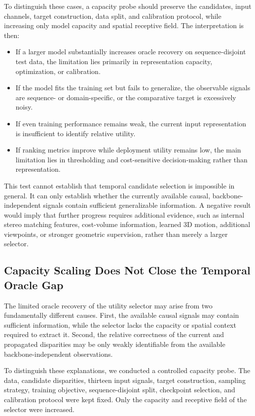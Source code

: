 \documentclass[11pt,a4paper]{article}
\begin{document}
To distinguish these cases, a capacity probe should preserve the candidates, input channels, target construction, data split, and calibration protocol, while increasing only model capacity and spatial receptive field. The interpretation is then:

\begin{itemize}
    \item If a larger model substantially increases oracle recovery on sequence-disjoint test data, the limitation lies primarily in representation capacity, optimization, or calibration.
    \item If the model fits the training set but fails to generalize, the observable signals are sequence- or domain-specific, or the comparative target is excessively noisy.
    \item If even training performance remains weak, the current input representation is insufficient to identify relative utility.
    \item If ranking metrics improve while deployment utility remains low, the main limitation lies in thresholding and cost-sensitive decision-making rather than representation.
\end{itemize}

This test cannot establish that temporal candidate selection is impossible in general. It can only establish whether the currently available causal, backbone-independent signals contain sufficient generalizable information. A negative result would imply that further progress requires additional evidence, such as internal stereo matching features, cost-volume information, learned 3D motion, additional viewpoints, or stronger geometric supervision, rather than merely a larger selector.

\subsection{Capacity Scaling Does Not Close the Temporal Oracle Gap}
\label{sec:capacity_probe}

The limited oracle recovery of the utility selector may arise from two fundamentally
different causes. First, the available causal signals may contain sufficient information,
while the selector lacks the capacity or spatial context required to extract it. Second,
the relative correctness of the current and propagated disparities may be only weakly
identifiable from the available backbone-independent observations.

To distinguish these explanations, we conducted a controlled capacity probe. The data,
candidate disparities, thirteen input signals, target construction, sampling strategy,
training objective, sequence-disjoint split, checkpoint selection, and calibration
protocol were kept fixed. Only the capacity and receptive field of the selector were
increased.
\end{document}
